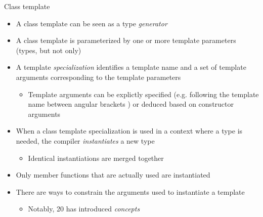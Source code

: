 \begin{frame}{Class template \insertcontinuationtext}
  \begin{itemize}
  \item A class template can be seen as a type \textit{generator}
  \item A class template is parameterized by one or more template parameters
    (types, but not only)
  \item A template \textit{specialization} identifies a template name and a set
    of template arguments corresponding to the template parameters
    \begin{itemize}
    \item Template arguments can be explictly specified (e.g. following the
      template name between angular brackets \code{<>}) or deduced based on
      constructor arguments
    \end{itemize}
  \item When a class template specialization is used in a context where a type
    is needed, the compiler \textit{instantiates} a new type
    \begin{itemize}
    \item Identical instantiations are merged together
    \end{itemize}
  \item Only member functions that are actually used are instantiated
  \item There are ways to constrain the arguments used to instantiate a template
    \begin{itemize}
    \item Notably, \Cpp{}20 has introduced \textit{concepts}
    \end{itemize}
  \end{itemize}
\end{frame}


